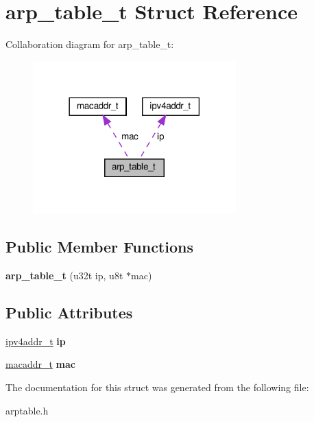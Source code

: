\hypertarget{structarp__table__t}{}\section{arp\+\_\+table\+\_\+t Struct Reference}
\label{structarp__table__t}


Collaboration diagram for arp\+\_\+table\+\_\+t\+:\nopagebreak
\begin{figure}[H]
\begin{center}
\leavevmode
\includegraphics[width=222pt]{structarp__table__t__coll__graph}
\end{center}
\end{figure}
\subsection*{Public Member Functions}
\begin{DoxyCompactItemize}
\item 
\mbox{\label{structarp__table__t_a55dbe4612e966b60efa8324e185922dc}} 
{\bfseries arp\+\_\+table\+\_\+t} (u32t ip, u8t $\ast$mac)
\end{DoxyCompactItemize}
\subsection*{Public Attributes}
\begin{DoxyCompactItemize}
\item 
\mbox{\label{structarp__table__t_ac52ee8bea2f590d4bc914c63a308e41e}} 
\hyperlink{unionipv4addr__t}{ipv4addr\+\_\+t} {\bfseries ip}
\item 
\mbox{\label{structarp__table__t_aa43555ba4be02b3ce8ff25269ef346f0}} 
\hyperlink{structmacaddr__t}{macaddr\+\_\+t} {\bfseries mac}
\end{DoxyCompactItemize}


The documentation for this struct was generated from the following file\+:\begin{DoxyCompactItemize}
\item 
arptable.\+h\end{DoxyCompactItemize}
